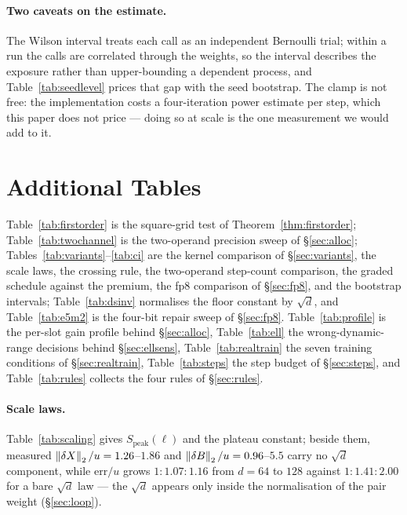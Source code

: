 \paragraph{Two caveats on the estimate.}  The Wilson interval treats each call as an
independent Bernoulli trial; within a run the calls are correlated through the weights, so
the interval describes the exposure rather than upper-bounding a dependent process, and
Table~\ref{tab:seedlevel} prices that gap with the seed bootstrap.  The
clamp is not free: the implementation costs a four-iteration power estimate per step, which
this paper does not price --- doing so at scale is the one measurement we would add to it.

\section{Additional Tables}
\label{app:tables}

Table~\ref{tab:firstorder} is the square-grid test of
Theorem~\ref{thm:firstorder}; Table~\ref{tab:twochannel} is the two-operand precision
sweep of \S\ref{sec:alloc}; Tables~\ref{tab:variants}--\ref{tab:ci} are the kernel
comparison of \S\ref{sec:variants}, the scale laws, the crossing rule, the two-operand
step-count comparison, the graded schedule against the premium, the fp8 comparison of
\S\ref{sec:fp8}, and the bootstrap intervals; Table~\ref{tab:dsinv} normalises the floor constant by
$\sqrt d$, and Table~\ref{tab:e5m2} is the four-bit repair sweep of \S\ref{sec:fp8}.
Table~\ref{tab:profile} is the per-slot gain profile behind \S\ref{sec:alloc},
Table~\ref{tab:ell} the wrong-dynamic-range decisions behind \S\ref{sec:ellsens},
Table~\ref{tab:realtrain} the seven training conditions of \S\ref{sec:realtrain},
Table~\ref{tab:steps} the step budget of \S\ref{sec:steps}, and
Table~\ref{tab:rules} collects the four rules of \S\ref{sec:rules}.

\paragraph{Scale laws.}  Table~\ref{tab:scaling} gives $S_{\mathrm{peak}}(\ell)$ and the
plateau constant; beside them, measured $\left\lVert \delta X \right\rVert_2/u = 1.26$--$1.86$ and
$\left\lVert \delta B \right\rVert_2/u = 0.96$--$5.5$ carry no $\sqrt d$ component, while $\mathrm{err}/u$
grows $1:1.07:1.16$ from $d=64$ to $128$ against $1:1.41:2.00$ for a bare $\sqrt d$ law
--- the $\sqrt d$ appears only inside the normalisation of the pair weight
(\S\ref{sec:loop}).

